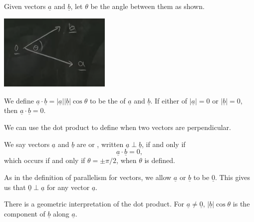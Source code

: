 \documentclass[a4]{scrartcl}
\begin{document}
\begin{definition}
	Given vectors $\underline{a}$ and $\underline{b}$, let $\theta$ be the angle between them as shown.
	\begin{center}
		\includegraphics[width=0.4\textwidth]{angle.png}
	\end{center}
	We define $\underline{a} \cdot \underline{b} = |\underline{a}| |\underline{b}| \cos \theta$ to be the  of $\underline{a}$ and $\underline{b}$.  If either of $|\underline{a}| = 0$ or $|\underline{b}| = 0$, then $\underline{a} \cdot \underline{b} = 0$.
\end{definition}

We can use the dot product to define when two vectors are perpendicular.

\begin{definition}[Perpendicularity]
	We say vectors $\underline{a}$ and $\underline{b}$ are  or , written $\underline{a} \perp \underline{b}$, if and only if
	$$
	\underline{a} \cdot \underline{b} = 0,
	$$
	which occurs if and only if $\theta = \pm \pi/2$, when $\theta$ is defined.
\end{definition}
As in the definition of parallelism for vectors, we allow $\underline{a}$ or $\underline{b}$ to be $\underline{0}$. This gives us that $\underline{0} \perp \underline{a}$ for any vector $\underline{a}$.


There is a geometric interpretation of the dot product. For $\underline{a}\neq \underline{0}$, $|\underline{b} | \cos \theta$ is the component of $\underline{b}$ along $\underline{a}$.
\end{document}
